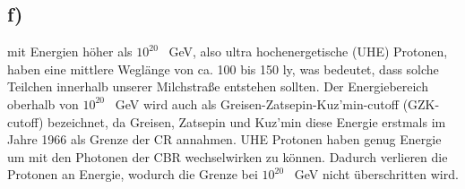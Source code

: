 \subsection{f)}

    \justifying mit Energien höher als $10^{20}$ \SI{}{\giga\electronvolt}, also ultra hochenergetische (UHE) Protonen, haben eine mittlere Weglänge von ca. 100 bis
    150 ly, was bedeutet, dass solche Teilchen innerhalb unserer Milchstraße entstehen sollten. Der Energiebereich oberhalb von $10^{20}$ \SI{}{\giga\electronvolt} wird auch als 
    Greisen-Zatsepin-Kuz'min-cutoff (GZK-cutoff) bezeichnet, da Greisen, Zatsepin und Kuz'min diese Energie erstmals im Jahre 1966 als Grenze der CR annahmen. UHE Protonen haben 
    genug Energie um mit den Photonen der CBR wechselwirken zu können. Dadurch verlieren die Protonen an Energie, wodurch die Grenze bei $10^{20}$ \SI{}{\giga\electronvolt} nicht
    überschritten wird. 


